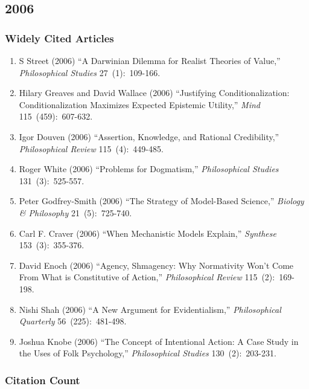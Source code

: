 \documentclass[
  10pt,
  letterpaper,
  DIV=11,
  numbers=noendperiod,
  twoside]{scrartcl}
\providecommand{\tightlist}{%
  \setlength{\itemsep}{0pt}\setlength{\parskip}{0pt}}\usepackage{longtable,booktabs,array}
\begin{document}
\newpage

\subsection{2006}\label{sec-s2006}

\subsubsection*{Widely Cited Articles}\label{widely-cited-articles-50}

\begin{enumerate}
\def\labelenumi{\arabic{enumi}.}
\tightlist
\item
  S Street (2006) ``A Darwinian Dilemma for Realist Theories of Value,''
  \emph{Philosophical Studies} 27~(1):~109-166.
\item
  Hilary Greaves and David Wallace (2006) ``Justifying
  Conditionalization: Conditionalization Maximizes Expected Epistemic
  Utility,'' \emph{Mind} 115~(459):~607-632.
\item
  Igor Douven (2006) ``Assertion, Knowledge, and Rational Credibility,''
  \emph{Philosophical Review} 115~(4):~449-485.
\item
  Roger White (2006) ``Problems for Dogmatism,'' \emph{Philosophical
  Studies} 131~(3):~525-557.
\item
  Peter Godfrey-Smith (2006) ``The Strategy of Model-Based Science,''
  \emph{Biology \& Philosophy} 21~(5):~725-740.
\item
  Carl F. Craver (2006) ``When Mechanistic Models Explain,''
  \emph{Synthese} 153~(3):~355-376.
\item
  David Enoch (2006) ``Agency, Shmagency: Why Normativity Won't Come
  From What is Constitutive of Action,'' \emph{Philosophical Review}
  115~(2):~169-198.
\item
  Nishi Shah (2006) ``A New Argument for Evidentialism,''
  \emph{Philosophical Quarterly} 56~(225):~481-498.
\item
  Joshua Knobe (2006) ``The Concept of Intentional Action: A Case Study
  in the Uses of Folk Psychology,'' \emph{Philosophical Studies}
  130~(2):~203-231.
\end{enumerate}

\subsubsection*{Citation Count}\label{sec-count-2006}
\end{document}
